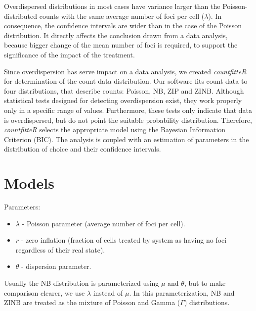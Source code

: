 Overdispersed distributions in most cases have variance larger than the Poisson-distributed counts with the same average number of foci per cell ($\lambda$). In consequence, the confidence intervals are wider than in the case of the Poisson distribution. It directly affects the conclusion drawn from a data analysis, because bigger change of the mean number of foci is required, to support the significance of the impact of the treatment. 

Since overdispersion has serve impact on a data analysis, we created \emph{countfitteR} for determination of the count data distribution. Our software fits count data to four distributions, that describe counts: Poisson, NB, ZIP and ZINB. Although statistical tests designed for detecting overdispersion exist, they work properly only in a specific range of values. Furthermore, these tests only indicate that data is overdispersed, but do not point the suitable probability distribution. Therefore, \emph{countfitteR} selects the appropriate model using the Bayesian Information Criterion (BIC). The analysis is coupled with an estimation of parameters in the distribution of choice and their confidence intervals.  


\section{Models}

Parameters:
\begin{itemize}
\item $\lambda$ - Poisson parameter (average number of foci per cell). 
\item $r$ - zero inflation (fraction of cells treated by system as having no foci regardless of their real state).
\item $\theta$ - dispersion parameter.
\end{itemize}
  
Usually the NB distribution is parameterized using $\mu$ and $\theta$, but to make comparison clearer, we use $\lambda$ instead of $\mu$. In this parameterization, NB and ZINB are treated as the mixture of Poisson and Gamma ($\Gamma$) distributions.  

